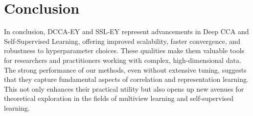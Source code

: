 \section*{Conclusion}

In conclusion, DCCA-EY and SSL-EY represent advancements in Deep CCA and Self-Supervised Learning, offering improved scalability, faster convergence, and robustness to hyperparameter choices. These qualities make them valuable tools for researchers and practitioners working with complex, high-dimensional data. The strong performance of our methods, even without extensive tuning, suggests that they capture fundamental aspects of correlation and representation learning. This not only enhances their practical utility but also opens up new avenues for theoretical exploration in the fields of multiview learning and self-supervised learning.